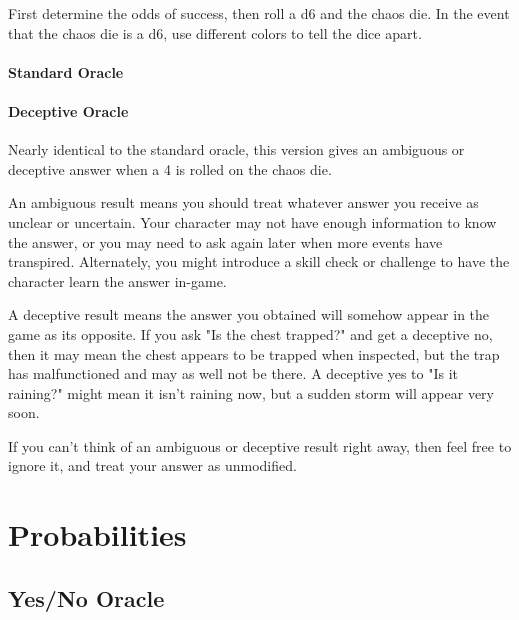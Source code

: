 First determine the odds of success, then roll a d6 and the chaos die. In the
event that the chaos die is a d6, use different colors to tell the dice apart.

\subsubsection{Standard Oracle}


\subsubsection{Deceptive Oracle}
Nearly identical to the standard oracle, this version gives an ambiguous or
deceptive answer when a 4 is rolled on the chaos die.

An ambiguous result means you should treat whatever answer you receive as
unclear or uncertain. Your character may not have enough information to know the
answer, or you may need to ask again later when more events have transpired.
Alternately, you might introduce a skill check or challenge to have the character
learn the answer in-game.

A deceptive result means the answer you obtained will somehow appear in the game
as its opposite. If you ask "Is the chest trapped?" and get a deceptive
no, then it may mean the chest appears to be trapped when inspected, but the
trap has malfunctioned and may as well not be there. A deceptive yes to "Is it
raining?" might mean it isn't raining now, but a sudden storm will appear very soon.

\begin{DndComment}{}
If you can't think of an ambiguous or deceptive result right away, then feel free
to ignore it, and treat your answer as unmodified.
\end{DndComment}



\appendix

\onecolumn
\chapter{Probabilities}
\section{Yes/No Oracle}
